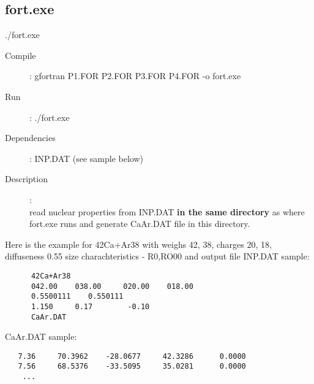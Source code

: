 \documentclass[preprint,review,12pt]{elsarticle}
\begin{document}
\begin{description}
{\begin{verbatim}
  Q: 3.37578  MeV E[2+]:   1.525MeV
Ca[A=42, Z=20] m: -38547.2  beta: 0.247 d: 0.55 beta[2+]: 0.25 E[2+]: 1.52
Ar[A=38, Z=18] m: -34714.8  beta: 0.163 d: 0.55 beta[2+]: 0.16 E[2+]: 2.18
   
  Q: -13.4048  MeV  E[2+]:   1.208MeV
Ca[A=38, Z=20] m: -22058.5  beta: 0     d: 0.55 beta[2+]: 0.12 E[2+]: 2.21
Ar[A=42, Z=18] m: -34423    beta: 0.275 d: 0.55 beta[2+]: 0.27 E[2+]: 1.21
   
   Q2n channel found: Q: 3.37578 E[2+]: 1.525
Ca[A=42, Z=20] m: -38547.2  beta: 0.247 d: 0.55 beta[2+]: 0.25 E[2+]: 1.52
Ar[A=38, Z=18] m: -34714.8  beta: 0.163 d: 0.55 beta[2+]: 0.16 E[2+]: 2.17

    \end{verbatim}  
    \end{description}


  \subsection{fort.exe}
  \label{sec:fort}
    ./fort.exe    %
    \begin{description}
       \item[Compile]:  gfortran P1.FOR P2.FOR P3.FOR P4.FOR -o fort.exe
       \item[Run]: ./fort.exe
       
       \item [Dependencies]:
           \subitem   INP.DAT (see sample below)

       \item [Description]: \\
           read nuclear properties from INP.DAT \textbf{in the same directory} as where fort.exe runs and generate CaAr.DAT file in this directory.
           
    \end{description}
       Here is the example for 42Ca+Ar38 with weighs 42, 38, charges 20, 18, diffuseness 0.55 size charachteristics - R0,RO00 and output file
      INP.DAT sample:
    \begin{verbatim}
      42Ca+Ar38
      042.00    038.00     020.00    018.00
      0.5500111    0.550111
      1.150     0.17        -0.10
      CaAr.DAT
    \end{verbatim}  
      CaAr.DAT sample:
    \begin{verbatim}
   7.36     70.3962    -28.0677     42.3286      0.0000
   7.56     68.5376    -33.5095     35.0281      0.0000 
    ... 
    \end{verbatim}  
\end{document}
